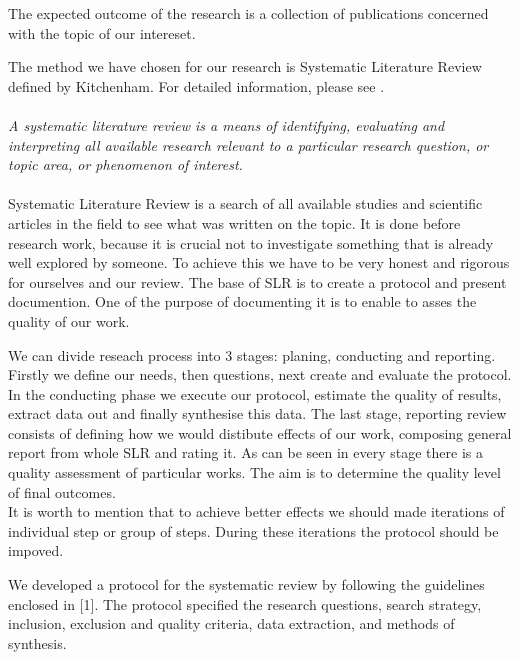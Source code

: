 \documentclass[times, 10pt,twocolumn]{article}
\begin{document}
The expected outcome of the research is a collection of publications concerned with the topic of our intereset.
 

The method we have chosen for our research is Systematic Literature Review defined by Kitchenham. For detailed information, please see \cite{kitchenham}. 
~\\
~\\
\emph {A systematic literature review is a means of identifying, evaluating and interpreting all available research relevant to a particular 
research question, or topic area, or phenomenon of interest.} \cite[p.~3]{kitchenham}
~\\
~\\
Systematic Literature Review is a search of all available studies and scientific articles in the field to see what was written on the topic. 
It is done before research work, because it is crucial not to investigate something that is already well explored by someone. To achieve this 
we have to be very honest and rigorous for ourselves and our review. The base of SLR is to create a protocol and present documention. One of 
the purpose of documenting it is to enable to asses the quality of our work. 

We can divide reseach process into 3 stages: planing, conducting and reporting. Firstly we define our needs, then questions, next create and evaluate 
the protocol. In the conducting phase we execute our protocol, estimate the quality of results, extract data out and finally synthesise this 
data. The last stage, reporting review consists of defining how we would distibute effects of our work, composing general report from whole 
SLR and rating it. As can be seen in every stage there is a quality assessment of particular works. The aim is to determine the quality level of final outcomes.
~\\
It is worth to mention that to achieve better effects we should made iterations of individual step or group of steps. During these iterations the protocol should be impoved.


We developed a protocol for the systematic review by following the guidelines enclosed in [1]. The protocol specified the research questions, search
strategy, inclusion, exclusion and quality criteria, data extraction, and methods of synthesis.
\end{document}
